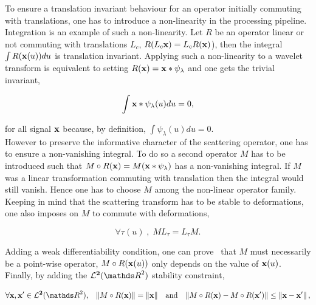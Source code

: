 \documentclass[a4paper,11pt]{report}
\begin{document}
      To ensure a translation invariant behaviour for an operator initially commuting with translations, one has to introduce a non-linearity in the processing pipeline. Integration is an example of such a non-linearity. Let $R$ be an operator linear or not commuting with translations $L_{c}$, \ie $R(L_{c}{\bf x}) = L_{c}R({\bf x})$), then the integral $\int R({\bf x}(u))du$ is  translation invariant. Applying such a non-linearity to a wavelet transform is equivalent to setting $R({\bf x}) = {\bf x} \ast \psi_{\lambda}$ and one gets the trivial invariant, 
      
      \begin{equation*}
				\label{eq:Trivial invariant}
				\int {\bf x} \ast \psi_{\lambda}(u)du = 0,
      \end{equation*}
      
      for all signal ${\bf x}$ because, by definition, $\int \psi_{\lambda}(u)du = 0$.\\
      
      However to preserve the informative character of the scattering operator, one has to ensure a non-vanishing integral. To do so a second operator $M$ has to be introduced such that $M \circ R({\bf x}) = M({\bf x} \ast \psi_{\lambda})$ has a non-vanishing integral. If $M$ was a linear transformation commuting with translation then the integral would still vanish. Hence one has to choose $M$ among the non-linear operator family.\\
      
      Keeping in mind that the scattering transform has to be stable to deformations, one also imposes on $M$ to commute with deformations, 
      
      \begin{equation*}
				\label{eq:Commute with deformations}
				\forall \tau(u) \; , \; M L_{\tau} = L_{\tau} M.
      \end{equation*}
      
      Adding a weak differentiability condition, one can prove~\citep{bruna2012commute} that $M$ must necessarily be a point-wise operator, \ie $M \circ R({\bf x}(u))$ only depends on the value of ${\bf x}(u)$.\\
      
      Finally, by adding the $\mathbf{\mcalL^{2}}(\dsR^{2})$ stability constraint,
      
      \begin{equation*}
				\label{eq:L2 stability}
				\forall \bfx,\bfx' \in \mathbf{\mcalL^{2}}(\dsR^{2}), \;\;\; 
				\norm{M \circ R(\bfx)} = \norm{\bfx} 
				\;\;\; \text{and} \;\;\;
				\norm{M \circ R(\bfx) - M \circ R(\bfx')} \leq \norm{\bfx-\bfx'},
      \end{equation*}     
      
\end{document}
